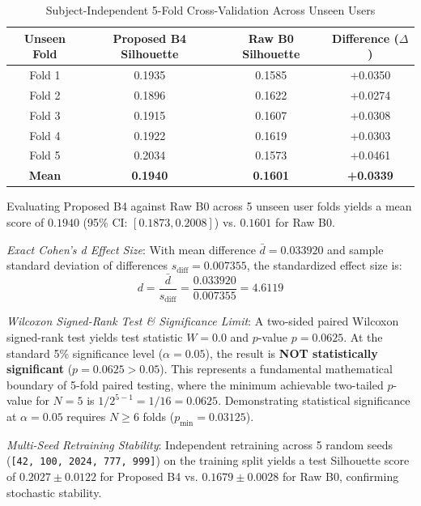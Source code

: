 \documentclass[conference]{IEEEtran}
\begin{document}
\begin{table}[htbp]
\caption{Subject-Independent 5-Fold Cross-Validation Across Unseen Users}
\begin{center}
\begin{tabular}{c c c c}
\toprule
\textbf{Unseen Fold} & \textbf{Proposed B4 Silhouette} & \textbf{Raw B0 Silhouette} & \textbf{Difference ($\Delta$)} \\
\midrule
Fold 1 & 0.1935 & 0.1585 & +0.0350 \\
Fold 2 & 0.1896 & 0.1622 & +0.0274 \\
Fold 3 & 0.1915 & 0.1607 & +0.0308 \\
Fold 4 & 0.1922 & 0.1619 & +0.0303 \\
Fold 5 & 0.2034 & 0.1573 & +0.0461 \\
\midrule
\textbf{Mean} & \textbf{0.1940} & \textbf{0.1601} & \textbf{+0.0339} \\
\bottomrule
\end{tabular}
\label{tab_folds}
\end{center}
\end{table}

Evaluating Proposed B4 against Raw B0 across 5 unseen user folds yields a mean score of $0.1940$ (95\% CI: $[0.1873, 0.2008]$) vs. $0.1601$ for Raw B0. 

\textit{Exact Cohen's d Effect Size}: With mean difference $\bar{d} = 0.033920$ and sample standard deviation of differences $s_{\text{diff}} = 0.007355$, the standardized effect size is:
\begin{equation}
d = \frac{\bar{d}}{s_{\text{diff}}} = \frac{0.033920}{0.007355} = 4.6119 \label{eq_cohend}
\end{equation}

\textit{Wilcoxon Signed-Rank Test \& Significance Limit}: A two-sided paired Wilcoxon signed-rank test yields test statistic $W = 0.0$ and $p$-value $p = 0.0625$. At the standard 5\% significance level ($\alpha = 0.05$), the result is \textbf{NOT statistically significant} ($p = 0.0625 > 0.05$). This represents a fundamental mathematical boundary of 5-fold paired testing, where the minimum achievable two-tailed $p$-value for $N=5$ is $1 / 2^{5-1} = 1/16 = 0.0625$. Demonstrating statistical significance at $\alpha = 0.05$ requires $N \ge 6$ folds ($p_{\min} = 0.03125$).

\textit{Multi-Seed Retraining Stability}: Independent retraining across 5 random seeds (\texttt{[42, 100, 2024, 777, 999]}) on the training split yields a test Silhouette score of $0.2027 \pm 0.0122$ for Proposed B4 vs. $0.1679 \pm 0.0028$ for Raw B0, confirming stochastic stability.
\end{document}
